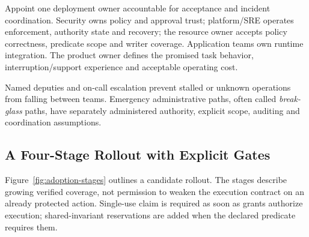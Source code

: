 Appoint one deployment owner accountable for acceptance and incident coordination. Security owns policy and approval trust; platform/SRE operates enforcement, authority state and recovery; the resource owner accepts policy correctness, predicate scope and writer coverage. Application teams own runtime integration. The product owner defines the promised task behavior, interruption/support experience and acceptable operating cost.

Named deputies and on-call escalation prevent stalled or unknown operations from falling between teams. Emergency administrative paths, often called \emph{break-glass} paths, have separately administered authority, explicit scope, auditing and coordination assumptions.



\subsection{A Four-Stage Rollout with Explicit Gates}
Figure~\ref{fig:adoption-stages} outlines a candidate rollout. The stages describe growing verified coverage, not permission to weaken the execution contract on an already protected action. Single-use claim is required as soon as grants authorize execution; shared-invariant reservations are added when the declared predicate requires them.

